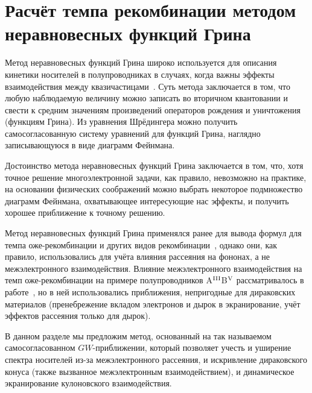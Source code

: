 \section{Расчёт темпа рекомбинации методом неравновесных функций Грина} \label{sec:NEGF}
Метод неравновесных функций Грина широко используется для описания кинетики носителей в полупроводниках в случаях, когда важны эффекты взаимодействия между квазичастицами~\cite{Haug}. Суть метода заключается в том, что любую наблюдаемую величину можно записать во вторичном квантовании и свести к средним значениям произведений операторов рождения и уничтожения (функциям Грина). Из уравнения Шрёдингера можно получить самосогласованную систему уравнений для функций Грина, наглядно записывающуюся в виде диаграмм Фейнмана.

Достоинство метода неравновесных функций Грина заключается в том, что, хотя точное решение многоэлектронной задачи, как правило, невозможно на практике, на основании физических соображений можно выбрать некоторое подмножество диаграмм Фейнмана, охватывающее интересующие нас эффекты, и получить хорошее приближение к точному решению.

Метод неравновесных функций Грина применялся ранее для вывода формул для темпа оже-рекомбинации и других видов рекомбинации~\cite{Ziep-Mocker,Yevick-GW_Auger}, однако они, как правило, использовались для учёта влияния рассеяния на фононах, а не межэлектронного взаимодействия. Влияние межэлектронного взаимодействия на темп оже-рекомбинации на примере полупроводников A$^{\rm III}$B$^{\rm V}$ рассматривалось в работе~\cite{Auger_scattering}, но в ней использовались приближения, непригодные для дираковских материалов (пренебрежение вкладом электронов и дырок в экранирование, учёт эффектов рассеяния только для дырок).

В данном разделе мы предложим метод, основанный на так называемом самосогласованном $GW$-приближении, который позволяет учесть и уширение спектра носителей из-за межэлектронного рассеяния, и искривление дираковского конуса (также вызванное межэлектронным взаимодействием), и динамическое экранирование кулоновского взаимодействия.


